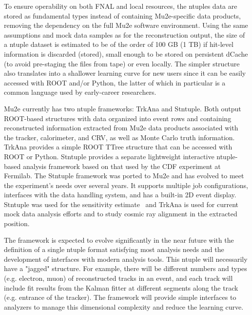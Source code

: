 To ensure operability on both FNAL and local resources, the ntuples data are stored as fundamental types instead of containing Mu2e-specific data products, removing the dependency on the full Mu2e software environment. Using the same assumptions and mock data samples as for the reconstruction output, the size of a ntuple dataset is estimated to be of the order of 100 GB (1 TB) if hit-level information is discarded (stored), small enough to be stored on persistent dCache (to avoid pre-staging the files from tape) or even locally. The simpler structure also translates into a shallower learning curve for new users since it can be easily accessed with ROOT and/or Python, the latter of which in particular is a common language used by early-career researchers.

Mu2e currently has two ntuple frameworks: TrkAna and Stntuple. Both output ROOT-based structures with data organized into event rows and containing reconstructed information extracted from Mu2e data products associated with the tracker, calorimeter, and CRV, as well as Monte Carlo truth information. TrkAna provides a simple ROOT TTree structure that can be accessed with ROOT or Python. Stntuple provides a separate lightweight interactive ntuple-based analysis framework based on that used by the CDF experiment at Fermilab. The Stntuple framework was ported to Mu2e and has evolved to meet the experiment's needs over several years. It supports multiple job configurations, interfaces with the data handling system, and has a built-in 2D event display. Stntuple was used for the \runone sensitivity estimate~\cite{Mu2e:2022ggl} and TrkAna is used for current mock data analysis efforts and to study cosmic ray alignment in the extracted position.

The framework is expected to evolve significantly in the near future with the definition of a single ntuple format satisfying most analysis needs and the development of interfaces with  modern analysis tools. This ntuple will necessarily have a "jagged" structure. For example, there will be different numbers and types (e.g. electron, muon) of reconstructed tracks in an event, and each track will include fit results from the Kalman fitter at different segments along the track (e.g. entrance of the tracker). The framework will provide simple interfaces to analyzers to manage this dimensional complexity and reduce the learning curve.

